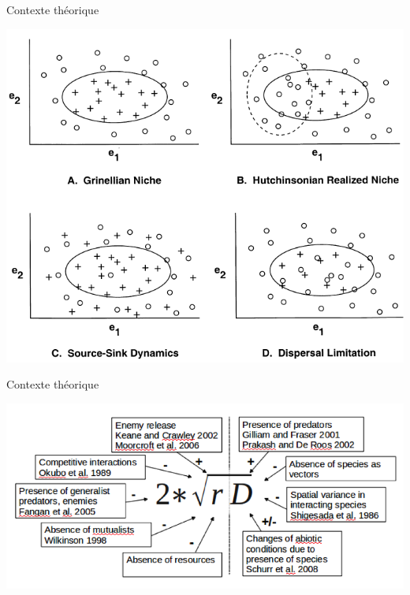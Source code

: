 \documentclass{eecslides}
\begin{document}
	\begin{frame}{Contexte théorique}
		\begin{center}
		\includegraphics[height=0.6\textheight]{pulliam}\\
		\end{center}
	\end{frame}


	\begin{frame}{Contexte théorique}
		\begin{center}
		\includegraphics[height=0.6\textheight]{svenning}\\
		\end{center}
	\end{frame}

\end{document}
